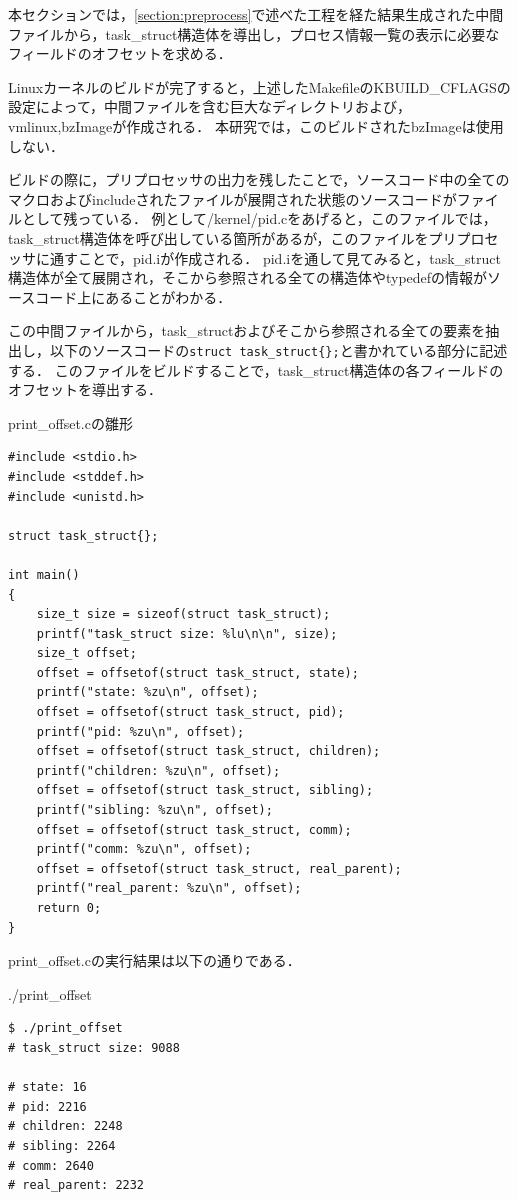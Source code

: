 本セクションでは，\ref{section:preprocess}で述べた工程を経た結果生成された中間ファイルから，task\_struct構造体を導出し，プロセス情報一覧の表示に必要なフィールドのオフセットを求める．

Linuxカーネルのビルドが完了すると，上述したMakefileのKBUILD_CFLAGSの設定によって，中間ファイルを含む巨大なディレクトリおよび，vmlinux,bzImageが作成される．
本研究では，このビルドされたbzImageは使用しない．

ビルドの際に，プリプロセッサの出力を残したことで，ソースコード中の全てのマクロおよびincludeされたファイルが展開された状態のソースコードがファイルとして残っている．
例として/kernel/pid.cをあげると，このファイルでは，task\_struct構造体を呼び出している箇所があるが，このファイルをプリプロセッサに通すことで，pid.iが作成される．
pid.iを通して見てみると，task\_struct構造体が全て展開され，そこから参照される全ての構造体やtypedefの情報がソースコード上にあることがわかる．

この中間ファイルから，task\_structおよびそこから参照される全ての要素を抽出し，以下のソースコードの\verb|struct task_struct{};|と書かれている部分に記述する．
このファイルをビルドすることで，task\_struct構造体の各フィールドのオフセットを導出する．

\begin{itembox}[l]{print_offset.cの雛形}
    \begin{verbatim}
#include <stdio.h>
#include <stddef.h>
#include <unistd.h>

struct task_struct{};

int main()
{
    size_t size = sizeof(struct task_struct);
    printf("task_struct size: %lu\n\n", size);
    size_t offset;
    offset = offsetof(struct task_struct, state);
    printf("state: %zu\n", offset);
    offset = offsetof(struct task_struct, pid);
    printf("pid: %zu\n", offset);
    offset = offsetof(struct task_struct, children);
    printf("children: %zu\n", offset);
    offset = offsetof(struct task_struct, sibling);
    printf("sibling: %zu\n", offset);
    offset = offsetof(struct task_struct, comm);
    printf("comm: %zu\n", offset);
    offset = offsetof(struct task_struct, real_parent);
    printf("real_parent: %zu\n", offset);
    return 0;
}
    \end{verbatim}
\end{itembox}

print_offset.cの実行結果は以下の通りである．

\begin{itembox}[l]{./print_offset}
    \begin{verbatim}
$ ./print_offset
# task_struct size: 9088

# state: 16
# pid: 2216
# children: 2248
# sibling: 2264
# comm: 2640
# real_parent: 2232
    \end{verbatim}
\end{itembox}

